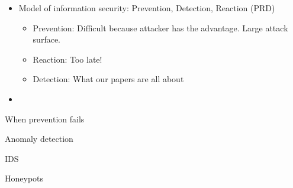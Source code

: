 \documentclass[compress]{beamer}
\begin{document}
\begin{frame}
    \begin{itemize}
        \item Model of information security: Prevention, Detection, Reaction
            (PRD)
            \begin{itemize}
                \item Prevention: Difficult because attacker has the advantage.
                    Large attack surface.


                \item
                    Reaction: Too late!
                \item
                    Detection: What our papers are all about
            \end{itemize}
        \item

    \end{itemize}
\end{frame}
\begin{frame}{When prevention fails}

\end{frame}
\begin{frame}{Anomaly detection}

\end{frame}
\begin{frame}{IDS}

\end{frame}
\begin{frame}{Honeypots}

\end{frame}
% 
\end{document}
